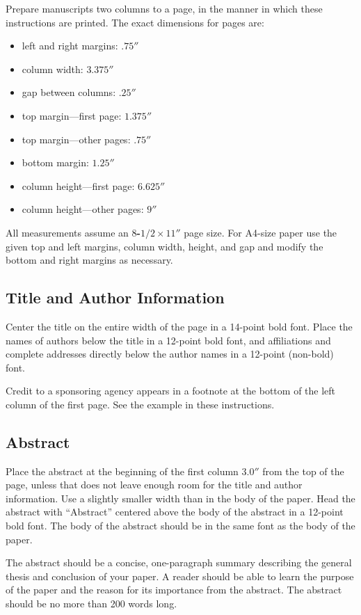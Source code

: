 \documentclass{article}
\begin{document}
Prepare manuscripts two columns to a page, in the manner in which these
instructions are printed.  The exact dimensions for pages are:
\begin{itemize}
\item left and right margins: $.75''$
\item column width: $3.375''$
\item gap between columns: $.25''$
\item top margin---first page: $1.375''$
\item top margin---other pages: $.75''$
\item bottom margin: $1.25''$
\item column height---first page: $6.625''$
\item column height---other pages: $9''$
\end{itemize}

All measurements assume an {\bf $8$-$1/2 \times 11''$} page size.  
For A4-size paper use the given top and left margins, column width,
height, and gap and modify the bottom and right margins as necessary.

\subsection{Title and Author Information}

Center the title on the entire width of the page in a 14-point bold font.
Place the names of authors below the title in a 12-point bold font, and
affiliations and complete addresses directly below the author names in a
12-point (non-bold) font.

Credit to a sponsoring agency appears in a footnote at the bottom of the
left column of the first page.  See the example in these instructions.

\subsection{Abstract}

Place the abstract at the beginning of the first column $3.0''$ from the
top of the page, unless that does not leave enough room for the title and
author information.  Use a slightly smaller width than in the body of the
paper.  Head the abstract with ``Abstract'' centered above the body of the
abstract in a 12-point bold font.  The body of the abstract should be in
the same font as the body of the paper.

The abstract should be a concise, one-paragraph summary
describing the general thesis and conclusion of your
paper. A reader should be able to learn the purpose of the
paper and the reason for its importance from the abstract. The
abstract should be no more than 200 words long.
\end{document}
